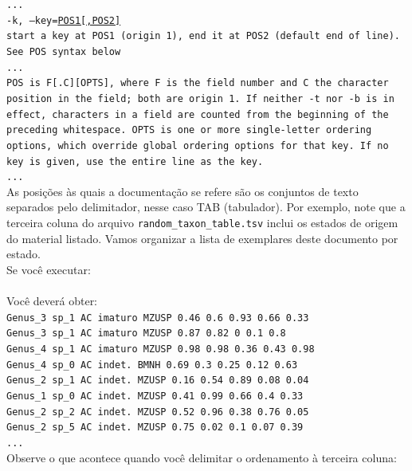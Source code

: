\begin{refsection}
\noindent\texttt{...}\\
\texttt{-k, --key=\underline{POS1[,POS2]}}\\
\indent\texttt{start a key at POS1 (origin 1), end it at POS2 (default end of line).  See POS syntax below}\\
\texttt{...}\\
\texttt{POS  is  F[.C][OPTS],  where  F  is the field number and C the character position in the field; both are origin 1.  If neither -t nor -b is in effect, characters in a field are counted from the beginning of the preceding whitespace.  OPTS is one or more single-letter ordering options, which override global ordering options for that key.  If no key is given, use the entire line as the key.}\\
\texttt{...}\\

As posições às quais a documentação se refere são os conjuntos de texto separados pelo delimitador, nesse caso \textsc{TAB} (tabulador). Por exemplo, note que a terceira coluna do arquivo \texttt{random\_taxon\_table.tsv} inclui os estados de origem do material listado. Vamos organizar a lista de exemplares deste documento por estado.\\

Se você executar:\\
\\

Você deverá obter:\\
\texttt{Genus\_3	sp\_1	AC	imaturo	MZUSP	0.46	0.6	0.93	0.66	0.33}\\
\texttt{Genus\_3	sp\_1	AC	imaturo	MZUSP	0.87	0.82	0	0.1	0.8}\\
\texttt{Genus\_4	sp\_1	AC	imaturo	MZUSP	0.98	0.98	0.36	0.43	0.98}\\
\texttt{Genus\_4	sp\_0	AC	indet.	BMNH	0.69	0.3	0.25	0.12	0.63}\\
\texttt{Genus\_2	sp\_1	AC	indet.	MZUSP	0.16	0.54	0.89	0.08	0.04}\\
\texttt{Genus\_1	sp\_0	AC	indet.	MZUSP	0.41	0.99	0.66	0.4	0.33}\\
\texttt{Genus\_2	sp\_2	AC	indet.	MZUSP	0.52	0.96	0.38	0.76	0.05}\\
\texttt{Genus\_2	sp\_5	AC	indet.	MZUSP	0.75	0.02	0.1	0.07	0.39}\\
\texttt{...}\\

Observe o que acontece quando você delimitar o ordenamento à terceira coluna:\\


\end{refsection}
